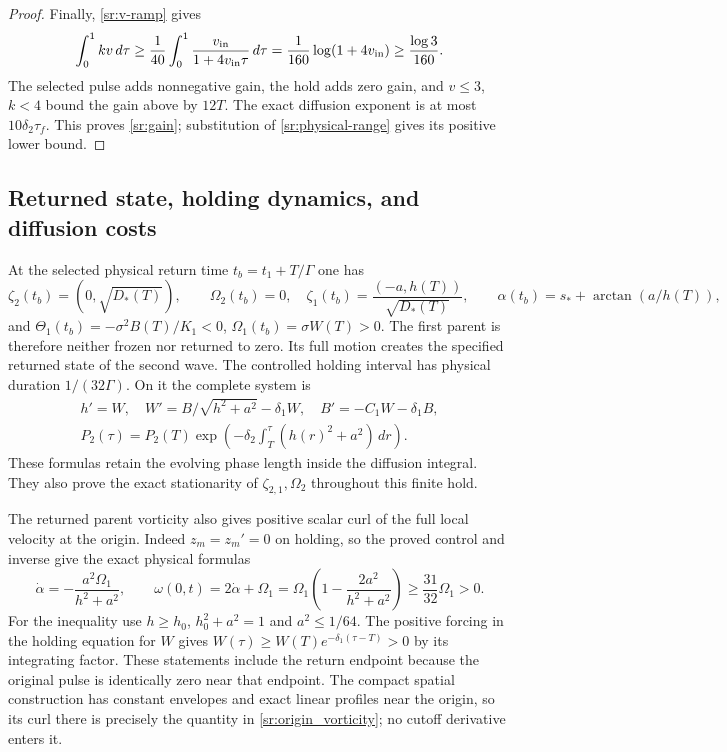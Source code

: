 \begin{proof}
Finally, \eqref{sr:v-ramp} gives
\[
 \int_0^1kv\,d\tau\geq
 \frac1{40}\int_0^1
 \frac{v_{\rm in}}{1+4v_{\rm in}\tau}\,d\tau
 =\frac1{160}\log(1+4v_{\rm in})
 \geq\frac{\log3}{160}.
\]
The selected pulse adds nonnegative gain, the hold adds zero gain,
and $v\leq3$, $k<4$ bound the gain above by $12T$.
The exact diffusion exponent is at most $10\delta_2\tau_f$.
This proves \eqref{sr:gain}; substitution of
\eqref{sr:physical-range} gives its positive lower bound.
\end{proof}

\subsection{Returned state, holding dynamics, and diffusion costs}

At the selected physical return time $t_b=t_1+T/\Gamma$ one has
\[
 \zeta_2(t_b)=(0,\sqrt{D_*(T)}),\qquad\Omega_2(t_b)=0,
 \quad\zeta_1(t_b)=\frac{(-a,h(T))}{\sqrt{D_*(T)}},\qquad
 \alpha(t_b)=s_*+\arctan(a/h(T)),
\]
and $\Theta_1(t_b)=-\sigma^2B(T)/K_1<0$,
$\Omega_1(t_b)=\sigma W(T)>0$. The first parent is therefore
neither frozen nor returned to zero. Its full motion creates the
specified returned state of the second wave.
The controlled holding interval has physical duration $1/(32\Gamma)$.
On it the complete system is
\[
 \begin{gathered}
 h'=W,\quad W'=B/\sqrt{h^2+a^2}-\delta_1W,
 \quad B'=-C_1W-\delta_1B,\\
 P_2(\tau)=P_2(T)\exp\!\left(-\delta_2
                  \int_T^\tau(h(r)^2+a^2)\,dr\right).
 \end{gathered}
\]
These formulas retain the evolving phase length inside the diffusion
integral. They also prove the exact stationarity of
$\zeta_{2,1},\Omega_2$ throughout this finite hold.

The returned parent vorticity also gives positive scalar curl of the
full local velocity at the origin. Indeed $z_m=z_m'=0$ on holding,
so the proved control and inverse give the exact physical formulas
\begin{equation}\label{sr:origin_vorticity}
 \dot\alpha=-\frac{a^2\Omega_1}{h^2+a^2},\qquad
 \omega(0,t)=2\dot\alpha+\Omega_1
   =\Omega_1\left(1-\frac{2a^2}{h^2+a^2}\right)
   \geq\frac{31}{32}\Omega_1>0.
\end{equation}
For the inequality use $h\geq h_0$, $h_0^2+a^2=1$ and
$a^2\leq1/64$. The positive forcing in the holding equation for
$W$ gives $W(\tau)\geq W(T)e^{-\delta_1(\tau-T)}>0$ by its
integrating factor. These statements include the return endpoint
because the original pulse is identically zero near that endpoint.
The compact spatial construction has constant envelopes and exact
linear profiles near the origin, so its curl there is precisely the
quantity in \eqref{sr:origin_vorticity}; no cutoff derivative enters it.

